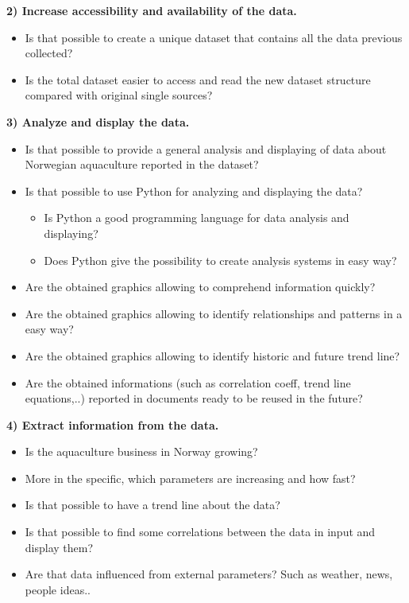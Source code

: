  
\textbf{2) Increase accessibility and availability of the data.}
\vspace{-5mm}
\begin{itemize}
 \setlength{\itemsep}{-5pt}
  \item Is that possible to create a unique dataset that contains all the data previous collected?
  \item Is the total dataset easier to access and read the new dataset structure compared with original single sources?
\end{itemize}
 
\textbf{3) Analyze and display the data.}
\vspace{-5mm}
\begin{itemize}
 \setlength{\itemsep}{-5pt}
  \item Is that possible to provide a general analysis and displaying of data about Norwegian aquaculture reported in the dataset?
  \item Is that possible to use Python for analyzing and displaying the data?
	\vspace{-3mm}
	\begin{itemize}
 	\setlength{\itemsep}{-5pt}
	\item Is Python a good programming language for data analysis and displaying?
	\item Does Python give the possibility to create analysis systems in easy way?
	 \end{itemize}
  \item Are the obtained graphics allowing to comprehend information quickly?
  \item Are the obtained graphics allowing to identify relationships and patterns in a easy way?
  \item Are the obtained graphics allowing to identify historic and future trend line?
  \item Are the obtained informations (such as correlation coeff, trend line equations,..) reported in documents ready to be reused in the future?
 \end{itemize}


\textbf{4) Extract information from the data.}
\vspace{-5mm}
\begin{itemize}
 \setlength{\itemsep}{-5pt}
  \item Is the aquaculture business in Norway growing? 
  \item More in the specific, which parameters are increasing and how fast? 
  \item Is that possible to have a trend line about the data? 
  \item Is that possible to find some correlations between the data in input and display them? 
  \item Are that data influenced from external parameters? Such as weather, news, people ideas..
 \end{itemize}
 
